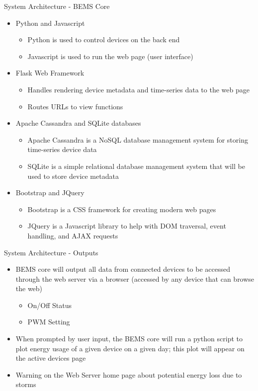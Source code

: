 \documentclass{beamer}
\begin{document}
\begin{frame}{System Architecture - BEMS Core}{} %
    \begin{itemize}
        \item Python and Javascript
            \begin{itemize}
                \item Python is used to control devices on the back end
                \item Javascript is used to run the web page (user interface)
            \end{itemize}
        \item Flask Web Framework
            \begin{itemize}
                \item Handles rendering device metadata and time-series data to the web page
                \item Routes URLs to view functions
            \end{itemize}
        \item Apache Cassandra and SQLite databases
            \begin{itemize}
                \item Apache Cassandra is a NoSQL database management system for storing time-series device data
                \item SQLite is a simple relational database management system that will be used to store device metadata
            \end{itemize}
        \item Bootstrap and JQuery
            \begin{itemize}
                \item Bootstrap is a CSS framework for creating modern web pages
                \item JQuery is a Javascript library to help with DOM traversal, event handling, and AJAX requests
            \end{itemize}
    \end{itemize}
\end{frame}

\begin{frame}{System Architecture - Outputs}{}
\begin{itemize}
    \item BEMS core will output all data from connected devices to be accessed through the web server via a browser (accessed by any device that can browse the web)
    \begin{itemize}
        \item On/Off Status
        \item PWM Setting
    \end{itemize}
    \item When prompted by user input, the BEMS core will run a python script to plot energy usage of a given device on a given day; this plot will appear on the active devices page
    \item Warning on the Web Server home page about potential energy loss due to storms
\end{itemize}
\end{frame}
\end{document}
